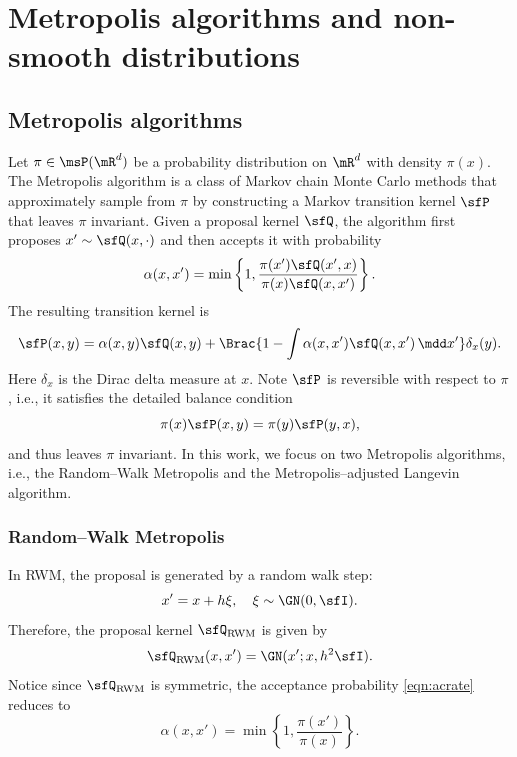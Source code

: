 \documentclass[11pt]{article}
\begin{document}
\section{Metropolis algorithms and non-smooth distributions}
\label{sec:Prelim}


\subsection{Metropolis algorithms}
\label{sec:Metropolis}

Let $\pi \in \msP(\mR^d)$ be a probability distribution on $\mR^d$ with density $\pi(x)$.
%
The Metropolis algorithm is a class of Markov chain Monte Carlo methods that approximately sample from $\pi$ by constructing a Markov transition kernel $\sfP$ that leaves $\pi$ invariant.
%
Given a proposal kernel $\sfQ$, the algorithm first proposes $x' \sim \sfQ(x,\cdot)$ and then accepts it with probability
\begin{equation}
\label{eqn:acrate}
    \alpha(x,x') = \min \left\{1,\frac{\pi(x')\sfQ(x',x)}{\pi(x)\sfQ(x,x')} \right\}.
\end{equation}
The resulting transition kernel is
\begin{equation}
\label{eqn:MHkernel}
    \sfP(x,y) = \alpha(x,y) \sfQ(x,y)
    + \Brac{ 1-\int \alpha(x,x')\sfQ(x,x')\,\mdd x'} \delta_x(y).
\end{equation}
Here $\delta_x$ is the Dirac delta measure at $x$.
Note $\sfP$ is reversible with respect to $\pi$, i.e., it satisfies the detailed balance condition 
\[  
    \pi(x) \sfP(x,y) = \pi(y) \sfP(y,x),
\]
and thus leaves $\pi$ invariant.
%
In this work, we focus on two Metropolis algorithms, i.e., the Random--Walk Metropolis and the Metropolis--adjusted Langevin algorithm.



\subsubsection{Random--Walk Metropolis}
\label{sec:RWM}
%
In RWM, the proposal is generated by a random walk step:
\begin{equation}
    x' = x + h \xi,\quad \xi\sim \GN(0,\sfI).
\end{equation}
Therefore, the proposal kernel $\sfQ_{\rm RWM}$ is given by
\begin{equation}
\label{eqn:Q_RWM}
    \sfQ_{\rm RWM}(x,x') = \GN(x';x,h^2 \sfI). 
\end{equation}
%
Notice since $\sfQ_{\rm RWM}$ is symmetric, the acceptance probability \eqref{eqn:acrate} reduces to
\begin{equation}
\label{eqn:acrate2}
    \alpha (x,x') = \min \left\{1,\frac{\pi(x')}{\pi(x)} \right\}.
\end{equation}
\end{document}
